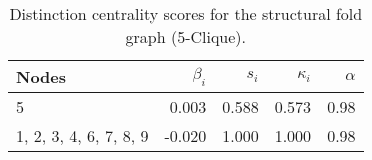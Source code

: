 \begin{table}
\centering
\caption{\label{tab:sf5}Distinction centrality scores for the structural fold graph (5-Clique).}
\centering
\begin{tabular}[t]{lrrrr}
\toprule
Nodes & $\beta_i$ & $s_i$ & $\kappa_i$ & $\alpha$\\
\midrule
5 & 0.003 & 0.588 & 0.573 & 0.98\\
1, 2, 3, 4, 6, 7, 8, 9 & -0.020 & 1.000 & 1.000 & 0.98\\
\bottomrule
\end{tabular}
\end{table}
